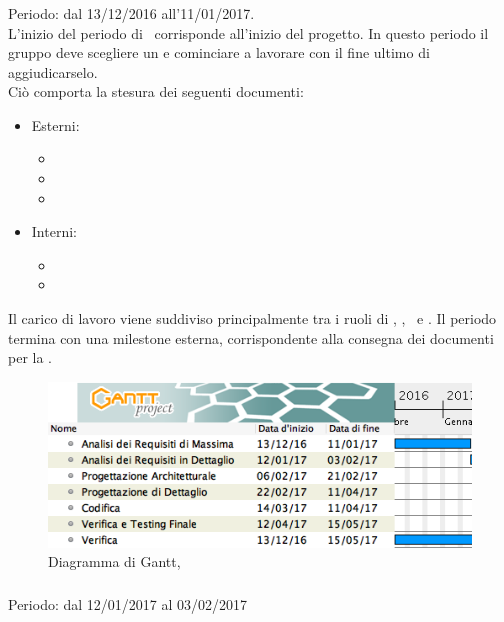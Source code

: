 \subsubsection{\ARM}
Periodo: dal 13/12/2016 all'11/01/2017. \\

L'inizio del periodo di \ARM\ corrisponde all'inizio del progetto. In questo periodo il gruppo deve scegliere un  e cominciare a lavorare con il fine ultimo di aggiudicarselo.\\
Ciò comporta la stesura dei seguenti documenti:
 \begin{itemize}
 \item Esterni:
 	\begin{itemize}
 	 \item \AdR
 	 \item \PdP
	 \item \PdQ
 	\end{itemize}
 \item  Interni:
	\begin{itemize}
	\item \SdF
	\item \NdP
	\end{itemize} 
 \end{itemize}
 Il carico di lavoro viene suddiviso principalmente tra i ruoli di \An, \Am, \Ver\ e \Pm.
 Il periodo termina con una milestone esterna, corrispondente alla consegna dei documenti per la \RR.
 
 \begin{figure}[H]
	\centering 
	\includegraphics[scale=0.5]{Immagini/Gantt/ARM.png}
	\caption{Diagramma di Gantt, \ARM}
\end{figure}

\subsubsection{\ARD}
Periodo: dal 12/01/2017 al 03/02/2017 \\

